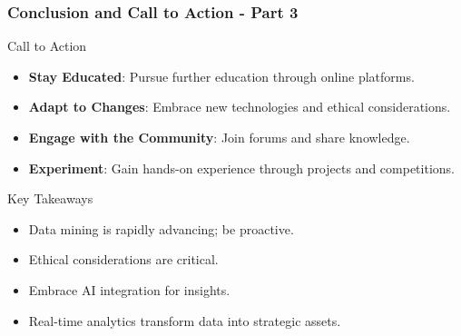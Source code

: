 \documentclass{beamer}
\begin{document}
\begin{frame}[fragile]
    \frametitle{Conclusion and Call to Action - Part 3}
    \begin{block}{Call to Action}
        \begin{itemize}
            \item \textbf{Stay Educated}: Pursue further education through online platforms.
            \item \textbf{Adapt to Changes}: Embrace new technologies and ethical considerations.
            \item \textbf{Engage with the Community}: Join forums and share knowledge.
            \item \textbf{Experiment}: Gain hands-on experience through projects and competitions.
        \end{itemize}
    \end{block}
    
    \begin{block}{Key Takeaways}
        \begin{itemize}
            \item Data mining is rapidly advancing; be proactive.
            \item Ethical considerations are critical.
            \item Embrace AI integration for insights.
            \item Real-time analytics transform data into strategic assets.
        \end{itemize}
    \end{block}
\end{frame}
\end{document}
